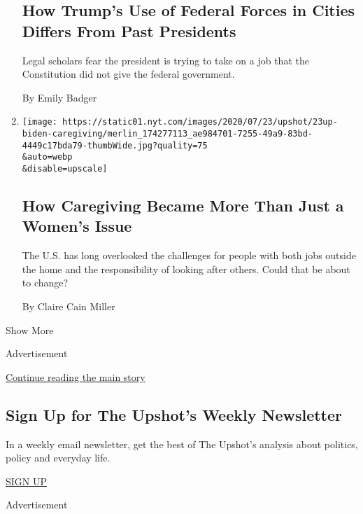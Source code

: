 \begin{enumerate}
  \hypertarget{how-trumps-use-of-federal-forces-in-cities-differs-from-past-presidents}{%
  \subsection{How Trump's Use of Federal Forces in Cities Differs From
  Past
  Presidents}\label{how-trumps-use-of-federal-forces-in-cities-differs-from-past-presidents}}

  Legal scholars fear the president is trying to take on a job that the
  Constitution did not give the federal government.

  By Emily Badger
\item
  \href{/2020/07/23/upshot/biden-caregiving-plan.html}{}

  \texttt{[image: https://static01.nyt.com/images/2020/07/23/upshot/23up-biden-caregiving/merlin\_174277113\_ae984701-7255-49a9-83bd-4449c17bda79-thumbWide.jpg?quality=75\\\&auto=webp\\\&disable=upscale]}

  \hypertarget{how-caregiving-became-more-than-just-a-womens-issue}{%
  \subsection{How Caregiving Became More Than Just a Women's
  Issue}\label{how-caregiving-became-more-than-just-a-womens-issue}}

  The U.S. has long overlooked the challenges for people with both jobs
  outside the home and the responsibility of looking after others. Could
  that be about to change?

  By Claire Cain Miller
\end{enumerate}

Show More

Advertisement

\protect\hyperlink{after-mid2}{Continue reading the main story}

\hypertarget{sign-up-for-the-upshots-weekly-newsletter}{%
\subsection{Sign Up for The Upshot's Weekly
Newsletter}\label{sign-up-for-the-upshots-weekly-newsletter}}

In a weekly email newsletter, get the best of The Upshot's analysis
about politics, policy and everyday life.

\href{/newsletters/signup/UP}{SIGN UP}

Advertisement

